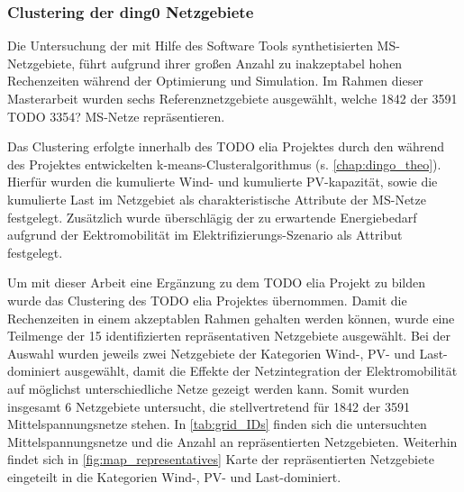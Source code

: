 \subsubsection{Clustering der ding0 Netzgebiete}


Die Untersuchung der mit Hilfe des Software Tools \dingo synthetisierten \gls{MS}-Netzgebiete, führt aufgrund ihrer großen Anzahl zu inakzeptabel hohen Rechenzeiten während der Optimierung und Simulation.
Im Rahmen dieser Masterarbeit wurden sechs Referenznetzgebiete ausgewählt, welche \num{1842} der \num{3591} {\color{red} TODO 3354?} \gls{MS}-Netze repräsentieren.\medskip

Das Clustering erfolgte innerhalb des {\color{red} TODO elia Projektes} durch den während des \openego Projektes entwickelten k-means-Clusteralgorithmus (s. \autoref{chap:dingo_theo}).
Hierfür wurden die kumulierte Wind- und kumulierte \gls{PV}-kapazität, sowie die kumulierte Last im Netzgebiet als charakteristische Attribute der \gls{MS}-Netze festgelegt.
Zusätzlich wurde überschlägig der zu erwartende Energiebedarf aufgrund der Eektromobilität im Elektrifizierungs-Szenario als Attribut festgelegt.\medskip


Um mit dieser Arbeit eine Ergänzung zu dem {\color{red} TODO elia Projekt} zu bilden wurde das Clustering des {\color{red} TODO elia Projektes} übernommen.
Damit die Rechenzeiten in einem akzeptablen Rahmen gehalten werden können, wurde eine Teilmenge der \num{15} identifizierten repräsentativen Netzgebiete ausgewählt.
Bei der Auswahl wurden jeweils zwei Netzgebiete der Kategorien Wind-, PV- und Last-dominiert ausgewählt, damit die Effekte der Netzintegration der Elektromobilität auf möglichst unterschiedliche Netze gezeigt werden kann.
Somit wurden insgesamt \num{6} Netzgebiete untersucht, die stellvertretend für \num{1842} der \num{3591} Mittelspannungsnetze stehen.
In \autoref{tab:grid_IDs} finden sich die untersuchten Mittelspannungsnetze und die Anzahl an repräsentierten Netzgebieten.
Weiterhin findet sich in \autoref{fig:map_representatives} Karte der repräsentierten Netzgebiete eingeteilt in die Kategorien Wind-, PV- und Last-dominiert.






